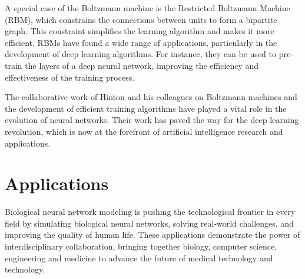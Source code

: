 \documentclass[paper=a4, fontsize=11pt]{scrartcl} %
\numberwithin{equation}{section} %
\numberwithin{figure}{section} %
\numberwithin{table}{section} %
\begin{document}
A special case of the Boltzmann machine is the Restricted Boltzmann Machine (RBM), which constrains the connections between units to form a bipartite graph. This constraint simplifies the learning algorithm and makes it more efficient. RBMs have found a wide range of applications, particularly in the development of deep learning algorithms. For instance, they can be used to pre-train the layers of a deep neural network, improving the efficiency and effectiveness of the training process.

The collaborative work of Hinton and his colleagues on Boltzmann machines and the development of efficient training algorithms have played a vital role in the evolution of neural networks. Their work has paved the way for the deep learning revolution, which is now at the forefront of artificial intelligence research and applications.





\section{Applications}
Biological neural network modeling is pushing the technological frontier in every field by simulating biological neural networks, solving real-world challenges, and improving the quality of human life. These applications demonstrate the power of interdisciplinary collaboration, bringing together biology, computer science, engineering and medicine to advance the future of medical technology and technology.
\end{document}
